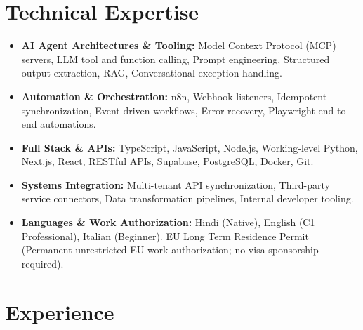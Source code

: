 \documentclass[10pt,a4paper]{article}
\begin{document}
\section{Technical Expertise}
\begin{itemize}
  \item \textbf{AI Agent Architectures \& Tooling:} Model Context Protocol (MCP) servers, LLM tool and function calling, Prompt engineering, Structured output extraction, RAG, Conversational exception handling.
  \item \textbf{Automation \& Orchestration:} n8n, Webhook listeners, Idempotent synchronization, Event-driven workflows, Error recovery, Playwright end-to-end automations.
  \item \textbf{Full Stack \& APIs:} TypeScript, JavaScript, Node.js, Working-level Python, Next.js, React, RESTful APIs, Supabase, PostgreSQL, Docker, Git.
  \item \textbf{Systems Integration:} Multi-tenant API synchronization, Third-party service connectors, Data transformation pipelines, Internal developer tooling.
  \item \textbf{Languages \& Work Authorization:} Hindi (Native), English (C1 Professional), Italian (Beginner). EU Long Term Residence Permit (Permanent unrestricted EU work authorization; no visa sponsorship required).
\end{itemize}

\section{Experience}
\end{document}
